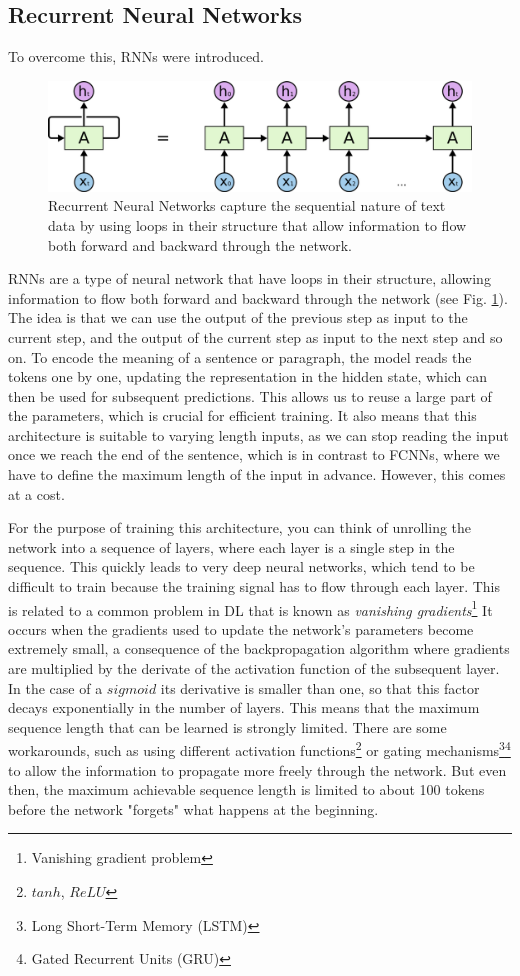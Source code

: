 \subsection{Recurrent Neural Networks}
To overcome this, RNNs were introduced.
\begin{figure}[h]
    \includegraphics[width=\linewidth]{chapters/NLP/figures/rnn.png}
    \caption{Recurrent Neural Networks capture the sequential nature of text data by using loops in their structure that allow information to flow both forward and backward through the network.}
    \label{fig:rnn}
\end{figure}
RNNs are a type of neural network that have loops in their structure, allowing information to flow both forward and backward through the network (see Fig. \ref{fig:rnn}).
The idea is that we can use the output of the previous step as input to the current step, and the output of the current step as input to the next step and so on.
To encode the meaning of a sentence or paragraph, the model reads the tokens one by one, updating the representation in the hidden state, which can then be used for subsequent predictions.
This allows us to reuse a large part of the parameters, which is crucial for efficient training.
It also means that this architecture is suitable to varying length inputs, as we can stop reading the input once we reach the end of the sentence, which is in contrast to FCNNs, where we have to define the maximum length of the input in advance.
However, this comes at a cost.

For the purpose of training this architecture, you can think of unrolling the network into a sequence of layers, where each layer is a single step in the sequence.
This quickly leads to very deep neural networks, which tend to be difficult to train because the training signal has to flow through each layer.
This is related to a common problem in DL that is known as \textit{vanishing gradients}\footnote{Vanishing gradient problem}
It occurs when the gradients used to update the network's parameters become extremely small, a consequence of the backpropagation algorithm where gradients are multiplied by the derivate of the activation function of the subsequent layer.
In the case of a $sigmoid$ its derivative is smaller than one, so that this factor decays exponentially in the number of layers.
This means that the maximum sequence length that can be learned is strongly limited.
There are some workarounds, such as using different activation functions\footnote{$tanh$, $ReLU$} or gating mechanisms\footnote{Long Short-Term Memory (LSTM)}\footnote{Gated Recurrent Units (GRU)} to allow the information to propagate more freely through the network.
But even then, the maximum achievable sequence length is limited to about 100 tokens before the network "forgets" what happens at the beginning.

